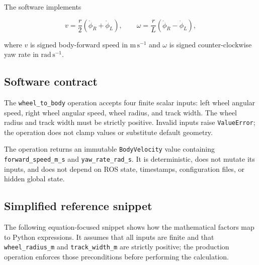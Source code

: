 \documentclass[
  australian,
  12pt,
  letterpaper,
  DIV=11,
  numbers=noendperiod,
  twoside]{scrreprt}
\begin{document}
The software implements

\[
v
=
\frac{r}{2}
\left(\dot\phi_R+\dot\phi_L\right),
\qquad
\omega
=
\frac{r}{L}
\left(\dot\phi_R-\dot\phi_L\right),
\]

where \(v\) is signed body-forward speed in \(\mathrm{m\,s^{-1}}\) and
\(\omega\) is signed counter-clockwise yaw rate in
\(\mathrm{rad\,s^{-1}}\).

\subsection{Software contract}\label{software-contract}

The \texttt{wheel\_to\_body} operation accepts four finite scalar
inputs: left wheel angular speed, right wheel angular speed, wheel
radius, and track width. The wheel radius and track width must be
strictly positive. Invalid inputs raise \texttt{ValueError}; the
operation does not clamp values or substitute default geometry.

The operation returns an immutable \texttt{BodyVelocity} value
containing \texttt{forward\_speed\_m\_s} and \texttt{yaw\_rate\_rad\_s}.
It is deterministic, does not mutate its inputs, and does not depend on
ROS state, timestamps, configuration files, or hidden global state.

\subsection{Simplified reference
snippet}\label{simplified-reference-snippet}

The following equation-focused snippet shows how the mathematical
factors map to Python expressions. It assumes that all inputs are finite
and that \texttt{wheel\_radius\_m} and \texttt{track\_width\_m} are
strictly positive; the production operation enforces those preconditions
before performing the calculation.
\end{document}
